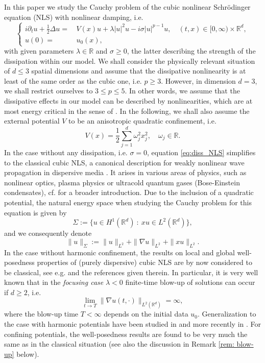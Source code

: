 \documentclass[a4paper,leqno]{amsart}
\theoremstyle{plain}
\theoremstyle{definition}
\numberwithin{equation}{section}
\begin{document}
In this paper we study the Cauchy problem of the cubic nonlinear Schr\"odinger equation (NLS) with nonlinear damping, i.e.
\begin{equation}\label{eq:diss_NLS}
\left \{
\begin{split}
i{\partial}_t u  + {\frac{1}{2}}\Delta u = & \, V(x) u+  \lambda|u |^2 u -i\sigma| u |^{p-1}u , \quad (t,x) \in [0, \infty)\times {{\mathbb R}}^d,\\
u(0) = & \, u_0(x),
\end{split}
\right.
\end{equation}
with given parameters $\lambda \in {{\mathbb R}}$ and $\sigma {\geqslant} 0$, the latter describing the strength of the dissipation within our model.
We shall consider the physically relevant situation of
$d{\leqslant} 3$ spatial dimensions and assume that the dissipative nonlinearity is at least of the same order as the cubic one, i.e. $p{\geqslant} 3$.
However, in dimension $d= 3$, we shall restrict ourselves to $3 {\leqslant} p {\leqslant} 5$.
In other words, we assume that the dissipative effects
in our model can be described by nonlinearities, which are at most energy critical in the sense of \cite{Caz, T}.
In the following, we shall also assume the external potential $V$ to be an anisotropic quadratic confinement, i.e.
\begin{equation}\label{eq:pot}
V(x)= \frac{1}{2}\sum_{j=1}^d {\omega}_j^2x_j^2, \quad \omega_j \in {{\mathbb R}}.
\end{equation}
In the case without any dissipation, i.e. $\sigma = 0$, equation \eqref{eq:diss_NLS} simplifies to the classical cubic NLS, a canonical description for
weakly nonlinear wave propagation in dispersive media \cite{SuSu}. It arises in various areas of physics, such as nonlinear optics, plasma physics
or ultracold quantum gases (Bose-Einstein condensates), cf. \cite{SuSu} for a broader introduction. 
Due to the inclusion of a quadratic potential, the natural energy space when studying the Cauchy problem for this equation is given by
\begin{equation*}
\Sigma:= \big \{ u \in H^1({{\mathbb R}}^d) \ : \ x u \in L^2({{\mathbb R}}^d) \big \},
\end{equation*}
and we consequently denote
\begin{equation*}
\| u \|_{\Sigma}:=\| u \|_{L^2}+\|\nabla u \|_{L^2} + \| x u \|_{L^2}.
\end{equation*}
In the case without harmonic confinement, the results on local and global well-posedness properties of (purely dispersive) cubic NLS are by now considered to be classical, see e.g. \cite{Caz, T}
and the references given therein. In particular, it is very well known that in the \emph{focusing case} $\lambda < 0$ 
finite-time blow-up of solutions can occur if $d{\geqslant} 2$, i.e.
$$\lim_{t \to T} \| \nabla u (t, \cdot) \|_{L^2({{\mathbb R}}^d)} = \infty,$$ where the blow-up time 
$T < \infty$ depends on the initial data $u_0 $. Generalization to the case with harmonic potentials have been studied in \cite{Fu, Oh, Zh} and more recently in 
\cite{Car1, Car3, Car, Carles}. For confining potentials, the well-posedness results are found to be very much the same as in the classical situation (see also the discussion in Remark \ref{rem: blow-up} below).
\end{document}
